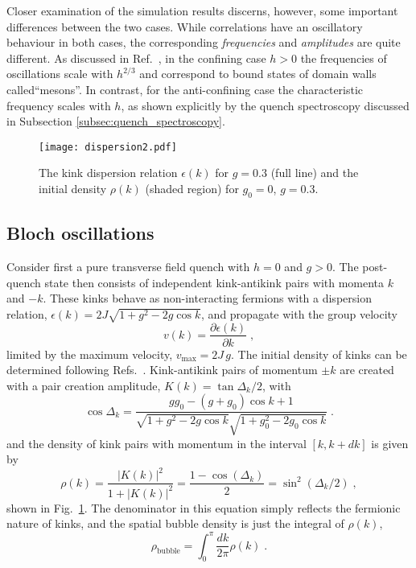 \documentclass[amsmath,amssymb,11pt]{article}
\numberwithin{equation}{section}
\numberwithin{figure}{section}
\numberwithin{table}{section}
\begin{document}
Closer examination of the simulation results discerns, however, some important differences between the two cases.  While  correlations have an oscillatory behaviour in both cases, the corresponding \emph{frequencies} and \emph{amplitudes} are quite different. As discussed in Ref.~\cite{2017NatPh..13..246K}, in the confining case $h>0$ the frequencies of  oscillations scale with $h^{2/3}$ and correspond to bound states of domain walls called``mesons''.  In contrast, for the anti-confining case the characteristic frequency scales with $h$, as shown explicitly by the quench spectroscopy discussed in Subsection \ref{subsec:quench_spectroscopy}. 

\begin{figure}
\centering
\texttt{[image: dispersion2.pdf]}
\caption{\label{fig:rho-and-epsilon} {The kink dispersion relation $\epsilon(k)$ for $g=0.3$ (full line) and the initial density $\rho(k)$ (shaded region) for $g_0=0$, $g=0.3$.}}
\end{figure}

\subsection{Bloch oscillations}

Consider first a pure transverse field quench with $h=0$ and $g>0$. The post-quench state then
consists  of independent kink-antikink pairs with momenta $k$ and
$-k$.  These kinks  behave as non-interacting fermions with a dispersion relation,
$\epsilon(k)=2J\sqrt{1+g^{2}-2g\cos k}$,
and propagate with the group velocity
\begin{equation}
 v(k)=\frac{\partial \epsilon(k)}{\partial k}\;,
\end{equation}
limited by the maximum velocity, $v_{\max}=2J\,g$. 
The initial density of kinks can be determined following Refs.~\cite{2011PhRvL.106v7203C,2012JSMTE..07..016C}.
Kink-antikink pairs of momentum $\pm k$ are created with a pair creation amplitude, $K(k)=\tan{\Delta_{k}}/{2}$, with
\begin{equation}
  \cos\Delta_{k} =\frac{gg_{0}-(g+g_{0})\cos k+1}{\sqrt{1+g^{2}-2g\cos k}\sqrt{1+g_{0}^{2}-2g_{0}\cos k}}\;.
\end{equation}
and the density of kink pairs with momentum in the interval $\left[k,k+dk\right]$ is given by
\begin{equation}
\rho(k)=\frac{\left|K(k)\right|^{2}}{1+\left|K(k)\right|^{2}} = \frac {1-\cos(\Delta_k)}2 = \sin^2(\Delta_k/2)\;,
\label{eq:density}
\end{equation}
shown in Fig.~\ref{fig:rho-and-epsilon}.
The denominator in this equation  simply reflects the fermionic nature of kinks, and the spatial bubble density is just the integral of $\rho(k)$,
\begin{equation}
\rho_\mathrm{bubble}=\int_{0}^{\pi}\frac{dk}{2\pi}\rho(k)\;.
\end{equation}
\end{document}
